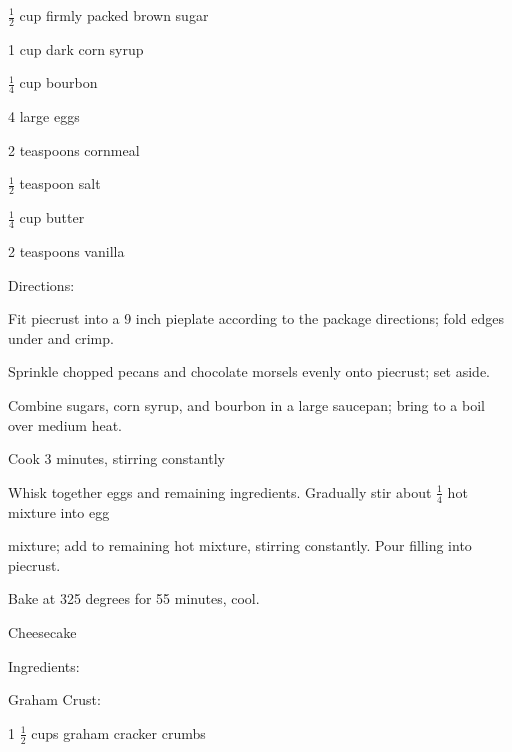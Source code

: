 \documentclass[a4paper,portrait,12pt]{book}
\begin{document}
$\frac{1}{2}$ cup firmly packed brown sugar




1 cup dark corn syrup




$\frac{1}{4}$ cup bourbon




4 large eggs




2 teaspoons cornmeal




$\frac{1}{2}$ teaspoon salt




$\frac{1}{4}$ cup butter




2 teaspoons vanilla




Directions:




Fit piecrust into a 9 inch pieplate according to the package directions; fold edges under and crimp.




Sprinkle chopped pecans and chocolate morsels evenly onto piecrust; set aside.




Combine sugars, corn syrup, and bourbon in a large saucepan; bring to a boil over medium heat.




Cook 3 minutes, stirring constantly




Whisk together eggs and remaining ingredients. Gradually stir about $\frac{1}{4}$ hot mixture into egg




mixture; add to remaining hot mixture, stirring constantly. Pour filling into piecrust.




Bake at 325 degrees for 55 minutes, cool.







\newpage
Cheesecake




Ingredients:




Graham Crust:




1 $\frac{1}{2}$ cups graham cracker crumbs
\end{document}
